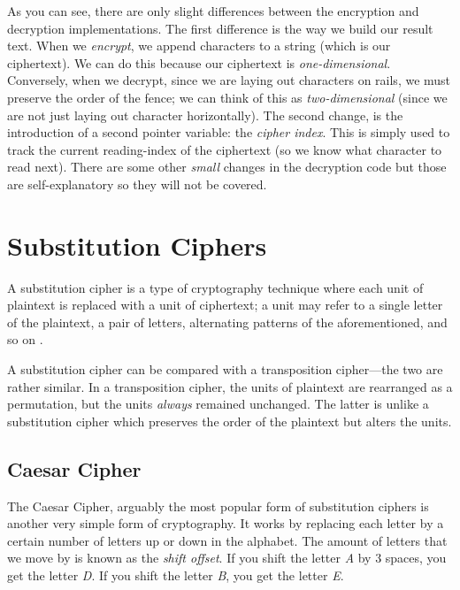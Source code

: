 As you can see, there are only slight differences between the encryption and decryption implementations. The first difference is the
way we build our result text. When we \textit{encrypt}, we append characters to a string (which is our ciphertext). We can do this because
our ciphertext is \textit{one-dimensional}. Conversely, when we decrypt, since we are laying out characters on rails, we must preserve the order of the
fence; we can think of this as \textit{two-dimensional} (since we are not just laying out character horizontally). 
The second change, is the introduction of a second pointer variable: the \textit{cipher index}. 
This is simply used to track the current reading-index of the ciphertext (so we know what character to read next). 
There are some other \textit{small} changes in the decryption code but those are self-explanatory so they will not be covered.

\section{Substitution Ciphers}

A substitution cipher is a type of cryptography technique where each unit of plaintext is replaced with a unit of ciphertext; a unit may refer to a single
letter of the plaintext, a pair of letters, alternating patterns of the aforementioned, and so on \cite{wiki:substitution_cipher}.

A substitution cipher can be compared with a transposition cipher---the two are rather similar. In a transposition cipher, the units of plaintext are rearranged as a
permutation, but the units \textit{always} remained unchanged. The latter is unlike a substitution cipher which preserves the order of the plaintext but alters
the units.

\subsection{Caesar Cipher}
The Caesar Cipher, arguably the most popular form of substitution ciphers is another very simple form of cryptography. 
It works by replacing each letter by a certain number of letters up or down in the alphabet. The amount of 
letters that we move by is known as the \textit{shift offset}. If you shift the letter \textit{A} by 3 spaces, you get 
the letter \textit{D}. If you shift the letter \textit{B}, you get the letter \textit{E}.

